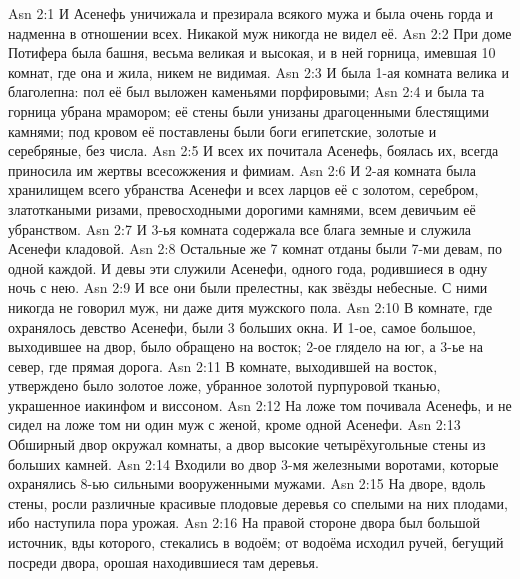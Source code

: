 \vs Asn 2:1
И Асенефь уничижала и презирала всякого мужа
и была очень горда и надменна в отношении всех.
Никакой муж никогда не видел её.
\vs Asn 2:2
При доме Потифера была башня,
весьма великая и высокая,
и в ней горница, имевшая 10 комнат,
где она и жила, никем не видимая.
\vs Asn 2:3
И была 1-ая комната велика и благолепна:
пол её был выложен каменьями порфировыми;
\vs Asn 2:4
и была та горница убрана мрамором;
её стены были унизаны драгоценными блестящими камнями;
под кровом её поставлены были боги египетские,
золотые и серебряные, без числа.
\vs Asn 2:5
И всех их почитала Асенефь,
боялась их,
всегда приносила им жертвы всесожжения и фимиам.
\vs Asn 2:6
И 2-ая комната была хранилищем всего убранства
Асенефи и всех ларцов её с золотом, серебром,
златоткаными ризами,
превосходными дорогими камнями,
всем девичьим её убранством.
\vs Asn 2:7
И 3-ья комната содержала все блага земные
и служила Асенефи кладовой.
\vs Asn 2:8
Остальные же 7 комнат отданы были 7-ми девам,
по одной каждой.
И девы эти служили Асенефи, одного года,
родившиеся в одну ночь с нею.
\vs Asn 2:9
И все они были прелестны, как звёзды небесные.
С ними никогда не говорил муж, ни даже дитя мужского пола.
\vs Asn 2:10
В комнате, где охранялось девство Асенефи,
были 3 больших окна.
И 1-ое, самое большое, выходившее на двор,
было обращено на восток;
2-ое глядело на юг,
а 3-ье на север, где прямая дорога.
\vs Asn 2:11
В комнате, выходившей на восток,
утверждено было золотое ложе,
убранное золотой пурпуровой тканью,
украшенное иакинфом и виссоном.
\vs Asn 2:12
На ложе том почивала Асенефь,
и не сидел на ложе том ни один муж с женой,
кроме одной Асенефи.
\vs Asn 2:13
Обширный двор окружал комнаты,
а двор высокие четырёхугольные стены из больших камней.
\vs Asn 2:14
Входили во двор 3-мя железными воротами,
которые охранялись 8-ью сильными вооруженными мужами.
\vs Asn 2:15
На дворе, вдоль стены,
росли различные красивые
плодовые деревья со спелыми на них плодами,
ибо наступила пора урожая.
\vs Asn 2:16
На правой стороне двора был большой источник,
вды которого, стекались в водоём; от водоёма исходил ручей,
бегущий посреди двора, орошая находившиеся там деревья.

